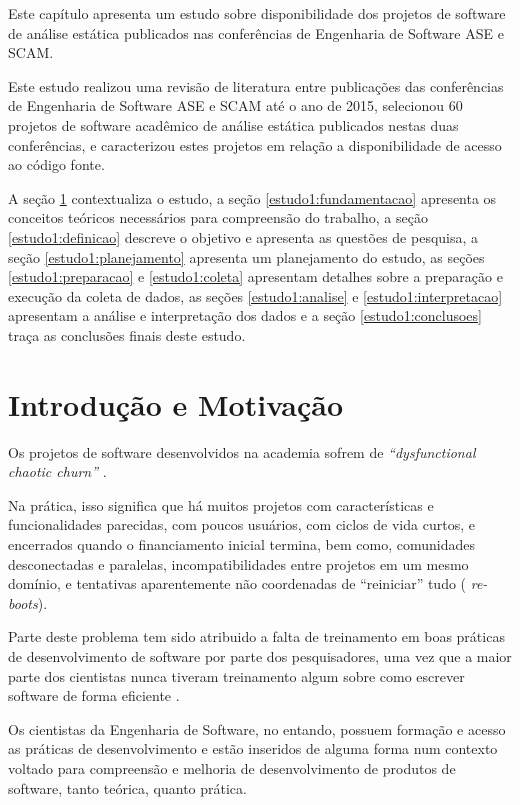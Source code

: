 {Este capítulo apresenta um estudo sobre disponibilidade dos projetos de
software de análise estática publicados nas conferências de Engenharia de
Software ASE e SCAM.}

Este estudo realizou uma revisão de literatura entre publicações das
conferências de Engenharia de Software ASE e SCAM até o ano de 2015, selecionou
60 projetos de software acadêmico de análise estática publicados nestas duas
conferências, e caracterizou estes projetos em relação a disponibilidade de
acesso ao código fonte.

A seção \ref{estudo1:introducao} contextualiza o estudo,
a seção \ref{estudo1:fundamentacao} apresenta os conceitos teóricos necessários para compreensão do trabalho,
a seção \ref{estudo1:definicao} descreve o objetivo e apresenta as questões de pesquisa,
a seção \ref{estudo1:planejamento} apresenta um planejamento do estudo,
as seções \ref{estudo1:preparacao} e \ref{estudo1:coleta} apresentam detalhes sobre a preparação e execução da coleta de dados,
as seções \ref{estudo1:analise} e \ref{estudo1:interpretacao} apresentam a análise e interpretação dos dados e
a seção \ref{estudo1:conclusoes} traça as conclusões finais deste estudo.

\section{Introdução e Motivação} \label{estudo1:introducao} %

Os projetos de software desenvolvidos na academia sofrem de {\it
``dysfunctional chaotic churn''} \cite{howison2015understanding}.

Na prática, isso significa que há muitos projetos com características e
funcionalidades parecidas, com poucos usuários, com ciclos de vida curtos, e
encerrados quando o financiamento inicial termina, bem como, comunidades
desconectadas e paralelas, incompatibilidades entre projetos em um mesmo
domínio, e tentativas aparentemente não coordenadas de ``reiniciar'' tudo ({\it
re-boots}).

Parte deste problema tem sido atribuido a falta de treinamento em boas práticas
de desenvolvimento de software por parte dos pesquisadores, uma vez que a maior
parte dos cientistas nunca tiveram treinamento algum sobre como escrever
software de forma eficiente \cite{wilson2017good}.

Os cientistas da Engenharia de Software, no entando, possuem formação e acesso
as práticas de desenvolvimento e estão inseridos de alguma forma num contexto
voltado para compreensão e melhoria de desenvolvimento de produtos de software,
tanto teórica, quanto prática.

